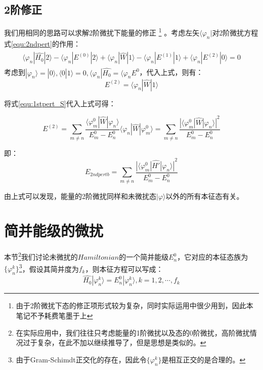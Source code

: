         \subsection{2阶修正}
        我们用相同的思路可以求解2阶微扰下能量的修正
        \footnote{由于2阶微扰下态的修正项形式较为复杂，同时实际运用中很少用到，因此本笔记不予耗费笔墨于上}
        。考虑左矢$\langle\varphi_n|$对2阶微扰方程式\eqref{equ:2ndpert}的作用：
        \begin{align}
            \begin{split}
                \langle\varphi_n|\hat{H_0}|2\rangle - \langle\varphi_n|E^{(0)}|2\rangle+ \langle\varphi_n|\hat{W}|1\rangle-\langle\varphi_n|E^{(1)}|1\rangle+\langle\varphi_n|E^{(2)}|0\rangle=0
            \end{split}
        \end{align}
        考虑到$|\varphi_n\rangle=|0\rangle,\langle0|1\rangle=0,\langle\varphi_n|\hat{H_0}=\langle\varphi_n E^{0}$，代入上式，则有：
        \begin{equation}
            E^{(2)}=\langle\varphi_n|\hat{W}|1\rangle
        \end{equation}
        
        将式\eqref{equ:1stpert_S}代入上式可得：
        
        \begin{equation}
            E^{(2)}=\sum_{m \ne n}\frac{\langle\varphi_m^0|\hat{W}|\varphi_n\rangle}{E_m^0-E_n^0}\langle\varphi_n|\hat{W}|\varphi_m^0\rangle=\sum_{m \ne n}\frac{{|\langle\varphi_m^0|\hat{W}|\varphi_n\rangle|}^2}{E_m^0-E_n^0}
        \end{equation}
        
        即：
        \begin{equation}
            E_{2ndpertb}=\sum_{m \ne n}\frac{{|\langle\varphi_m^0|\hat{H'}|\varphi_n\rangle|}^2}{E_m^0-E_n^0}
        \end{equation}
        
        由上式可以发现，能量的2阶微扰同样和未微扰态$|\varphi\rangle$以外的所有本征态有关。
\section{简并能级的微扰}
本节\footnote{在实际应用中，我们往往只考虑能量的1阶微扰以及态的0阶微扰，高阶微扰情况过于复杂，在此不加以继续推导了，但是思想是类似的。}我们讨论未微扰的$Hamiltonian$的一个简并能级$E_n^0$，它对应的本征态族为$\{\varphi_n^k\}$\footnote{由于Gram-Schimdt正交化的存在，因此令$\{\varphi_n^k\}$是相互正交的是合理的。}，假设其简并度为$f_k$，则本征方程可以写成：
\begin{equation}\label{equ7:eigen_generate}
    \hat{H_0}|\varphi_n^k\rangle=E_n^0|\varphi_n^k\rangle,k=1,2,\cdots,f_k
\end{equation}

